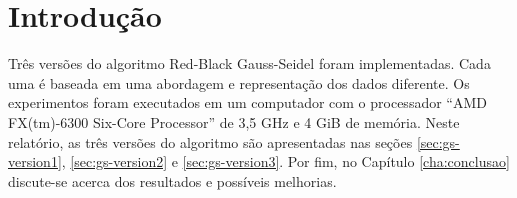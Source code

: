 \chapter{Introdução}
\label{cha:introducao}

Três versões do algoritmo Red-Black Gauss-Seidel foram implementadas. Cada uma é baseada em uma abordagem e representação dos dados diferente. Os experimentos foram executados em um computador com o processador ``AMD FX(tm)-6300 Six-Core Processor'' de 3,5 GHz e 4 GiB de memória. Neste relatório, as três versões do algoritmo são apresentadas nas seções \ref{sec:gs-version1}, \ref{sec:gs-version2} e \ref{sec:gs-version3}. Por fim, no Capítulo \ref{cha:conclusao} discute-se acerca dos resultados e possíveis melhorias.
